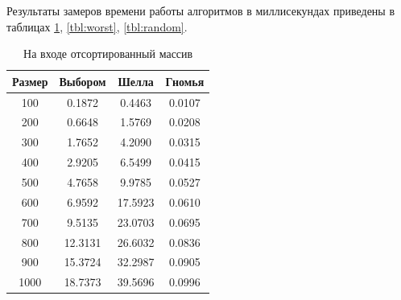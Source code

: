 Результаты замеров времени работы алгоритмов в миллисекундах приведены в таблицах \ref{tbl:best}, \ref{tbl:worst}, \ref{tbl:random}.

\begin{table}[h]
	\begin{center}
		\begin{threeparttable}
		\captionsetup{justification=raggedleft,singlelinecheck=off}
		\caption{На входе отсортированный массив}
		\label{tbl:best}
		\begin{tabular}{|c|c|c|c|}
			\hline
			Размер & Выбором & Шелла & Гномья \\
			\hline
  			100 & 0.1872 & 0.4463 & 0.0107 \\ 
 			\hline
  			200 & 0.6648 & 1.5769 & 0.0208 \\ 
 			\hline
  			300 & 1.7652 & 4.2090 & 0.0315 \\ 
 			\hline
  			400 & 2.9205 & 6.5499 & 0.0415 \\ 
 			\hline
  			500 & 4.7658 & 9.9785 & 0.0527 \\ 
 			\hline
  			600 & 6.9592 & 17.5923 & 0.0610 \\ 
 			\hline
  			700 & 9.5135 & 23.0703 & 0.0695 \\ 
 			\hline
  			800 & 12.3131 & 26.6032 & 0.0836 \\ 
 			\hline
  			900 & 15.3724 & 32.2987 & 0.0905 \\ 
 			\hline
 			1000 & 18.7373 & 39.5696 & 0.0996 \\ 
 			\hline
		\end{tabular}
		\end{threeparttable}
    \end{center}
\end{table}

